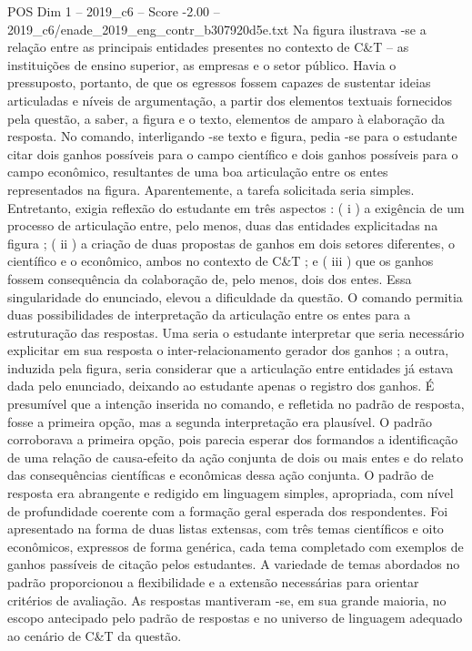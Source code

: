 \begin{textsample}{POS Dim 1 – 2019\_c6 – Score -2.00 – 2019\_c6/enade\_2019\_eng\_contr\_b307920d5e.txt}
Na figura ilustrava -se a relação entre as principais entidades presentes no contexto de C\&T – as instituições de ensino superior, as empresas e o setor público.
Havia o pressuposto, portanto, de que os egressos fossem capazes de sustentar ideias articuladas e níveis de argumentação, a partir dos elementos textuais fornecidos pela questão, a saber, a figura e o texto, elementos de amparo à elaboração da resposta.
No comando, interligando -se texto e figura, pedia -se para o estudante citar dois ganhos possíveis para o campo científico e dois ganhos possíveis para o campo econômico, resultantes de uma boa articulação entre os entes representados na figura.
Aparentemente, a tarefa solicitada seria simples.
Entretanto, exigia reflexão do estudante em três aspectos : ( i ) a exigência de um processo de articulação entre, pelo menos, duas das entidades explicitadas na figura ; ( ii ) a criação de duas propostas de ganhos em dois setores diferentes, o científico e o econômico, ambos no contexto de C\&T ; e ( iii ) que os ganhos fossem consequência da colaboração de, pelo menos, dois dos entes.
Essa singularidade do enunciado, elevou a dificuldade da questão.
O comando permitia duas possibilidades de interpretação da articulação entre os entes para a estruturação das respostas.
Uma seria o estudante interpretar que seria necessário explicitar em sua resposta o inter-relacionamento gerador dos ganhos ; a outra, induzida pela figura, seria considerar que a articulação entre entidades já estava dada pelo enunciado, deixando ao estudante apenas o registro dos ganhos.
É presumível que a intenção inserida no comando, e refletida no padrão de resposta, fosse a primeira opção, mas a segunda interpretação era plausível.
O padrão corroborava a primeira opção, pois parecia esperar dos formandos a identificação de uma relação de causa-efeito da ação conjunta de dois ou mais entes e do relato das consequências científicas e econômicas dessa ação conjunta.
O padrão de resposta era abrangente e redigido em linguagem simples, apropriada, com nível de profundidade coerente com a formação geral esperada dos respondentes.
Foi apresentado na forma de duas listas extensas, com três temas científicos e oito econômicos, expressos de forma genérica, cada tema completado com exemplos de ganhos passíveis de citação pelos estudantes.
A variedade de temas abordados no padrão proporcionou a flexibilidade e a extensão necessárias para orientar critérios de avaliação.
As respostas mantiveram -se, em sua grande maioria, no escopo antecipado pelo padrão de respostas e no universo de linguagem adequado ao cenário de C\&T da questão.

\end{textsample}
